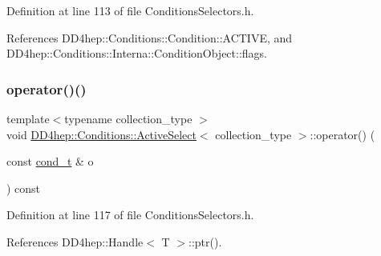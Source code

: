 Definition at line 113 of file Conditions\+Selectors.\+h.



References D\+D4hep\+::\+Conditions\+::\+Condition\+::\+A\+C\+T\+I\+VE, and D\+D4hep\+::\+Conditions\+::\+Interna\+::\+Condition\+Object\+::flags.

\hypertarget{class_d_d4hep_1_1_conditions_1_1_active_select_a7a4ce2ce3b9e622bd88720e6f23f5358}{}\label{class_d_d4hep_1_1_conditions_1_1_active_select_a7a4ce2ce3b9e622bd88720e6f23f5358} 
\subsubsection{\texorpdfstring{operator()()}{operator()()}\hspace{0.1cm}{\footnotesize\ttfamily [2/4]}}
{\footnotesize\ttfamily template$<$typename collection\+\_\+type $>$ \\
void \hyperlink{class_d_d4hep_1_1_conditions_1_1_active_select}{D\+D4hep\+::\+Conditions\+::\+Active\+Select}$<$ collection\+\_\+type $>$\+::operator() (\begin{DoxyParamCaption}\item[{const \hyperlink{class_d_d4hep_1_1_conditions_1_1_cond_____oper_aceca9f6a0e8c84364946eace47275d09}{cond\+\_\+t} \&}]{o }\end{DoxyParamCaption}) const\hspace{0.3cm}{\ttfamily [inline]}}



Definition at line 117 of file Conditions\+Selectors.\+h.



References D\+D4hep\+::\+Handle$<$ T $>$\+::ptr().

\hypertarget{class_d_d4hep_1_1_conditions_1_1_active_select_a3c401bdf333aafce29bd98764df55b97}{}\label{class_d_d4hep_1_1_conditions_1_1_active_select_a3c401bdf333aafce29bd98764df55b97} 
